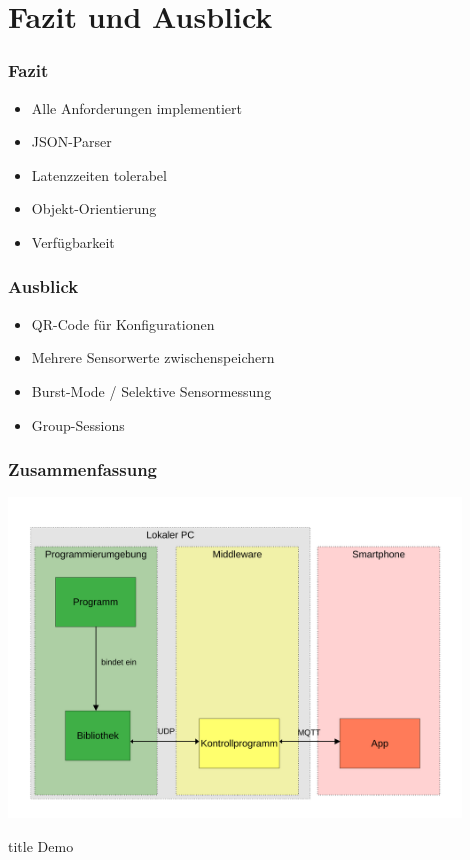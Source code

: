 \documentclass{beamer}
\begin{document}
\section{Fazit und Ausblick}
\begin{frame}
    \frametitle[]{Fazit}
    \begin{itemize}
        \item Alle Anforderungen implementiert
        \item JSON-Parser
        \item Latenzzeiten tolerabel
        \item Objekt-Orientierung
        \item Verfügbarkeit
    \end{itemize}
\end{frame}
\begin{frame}
    \frametitle[]{Ausblick}
    \begin{itemize}
        \item QR-Code für Konfigurationen
        \item Mehrere Sensorwerte zwischenspeichern
        \item Burst-Mode / Selektive Sensormessung
        \item Group-Sessions
    \end{itemize}
\end{frame}

\begin{frame}
    \frametitle{Zusammenfassung}
    \vfill
    \centering
    \includegraphics[width=0.9\textwidth]{images/framework.pdf}
\end{frame}

\begin{frame}
    \vfill
    \centering
    \begin{beamercolorbox}[sep=8pt,center,shadow=true,rounded=true]{title}
      Demo
    \end{beamercolorbox}
    \vfill
    \end{frame}
\end{document}
